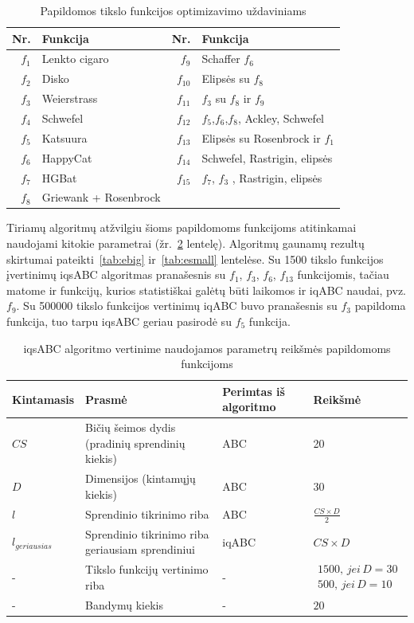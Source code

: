 \documentclass{VUMIFPSmagistrinis}
\begin{document}
\begin{table}[H]
\centering
\caption{Papildomos tikslo funkcijos optimizavimo uždaviniams}
\label{tab:extra}
\begin{tabular}{r|l|r|l}
Nr.&Funk\-ci\-ja&Nr.&Funk\-ci\-ja\\
\hline
$f_{1}$ & Lenkto cigaro   &$f_{9}$ & Schaffer $f_6$\\
$f_{2}$ & Disko           &$f_{10}$ & Elipsės su $f_8$\\
$f_{3}$ & Weierstrass     &$f_{11}$ & $f_3$ su $f_8$ ir $f_9$ \\
$f_{4}$ & Schwefel        &$f_{12}$ & $f_5$,$f_6$,$f_8$, Ackley, Schwefel\\
$f_{5}$ & Katsuura       &$f_{13}$ & Elipsės su Rosenbrock ir $f_1$\\
$f_{6}$ & HappyCat      &$f_{14}$ & Schwefel, Rastrigin, elipsės\\
$f_{7}$ & HGBat       &$f_{15}$ & $f_7$, $f_3$ , Rastrigin, elipsės \\
$f_{8}$ & Griewank + Rosenbrock    &&

\end{tabular}
\end{table}


Tiriamų algoritmų atžvilgiu šioms papildomoms funkcijoms atitinkamai naudojami kitokie parametrai (žr.~\ref{tab:par2} lentelę). Algoritmų gaunamų rezultų skirtumai pateikti~\ref{tab:ebig} ir~\ref{tab:esmall} lentelėse. Su 1500 tikslo funkcijos įvertinimų iqsABC algoritmas pranašesnis su $f_{1}$, $f_{3}$, $f_{6}$, $f_{13}$ funkcijomis, tačiau matome ir funkcijų, kurios statistiškai galėtų būti laikomos ir iqABC naudai, pvz. $f_{9}$.  Su 500000 tikslo funkcijos vertinimų iqABC buvo pranašesnis su $f_{3}$ papildoma funkcija, tuo tarpu iqsABC geriau pasirodė su $f_{5}$ funkcija.

\begin{table}[H]
\centering
\caption{iqsABC algoritmo vertinime naudojamos parametrų reikšmės papildomoms funkcijoms}
\label{tab:par2}
\begin{tabular}{llXl}
Kintamasis&Prasmė&Perimtas iš algoritmo&Reikšmė \\ \hline
$CS$ & Bičių šeimos dydis (pradinių sprendinių kiekis) & ABC & 20 \\ \hline
$D$& Dimensijos (kintamųjų kiekis) & ABC & $30$ \\ \hline
$l$ & Sprendinio tikrinimo riba & ABC & $\frac{CS\times D}{2}$ \\ \hline
$l_{geriausias}$ & Sprendinio tikrinimo riba geriausiam sprendiniui & iqABC & $CS\times D$ \\ \hline
- & Tikslo funkcijų vertinimo riba & -  & $\begin{matrix}  1500,\, jei\, D=30\\  500,\, jei\, D=10  \end{matrix}$ \\ \hline
- & Bandymų kiekis & - & $20$
\end{tabular}
\end{table}
\end{document}
